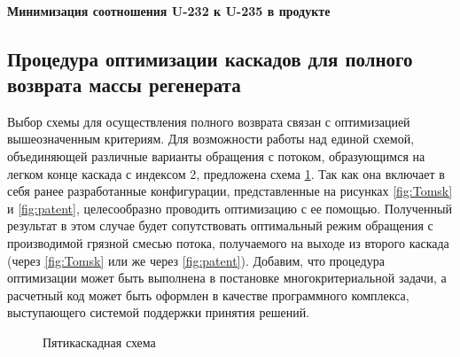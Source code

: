 \paragraph{Минимизация соотношения U-232 к U-235 в продукте}

\subsection{Процедура оптимизации каскадов для полного возврата массы регенерата}\label{sec:ch2/sec5.2}
Выбор схемы для осуществления полного возврата связан с оптимизацией вышеозначенным критериям. Для возможности работы над единой схемой, объединяющей различные варианты обращения с потоком, образующимся на легком конце каскада с индексом 2, предложена схема \ref{fig:Total scheme}. Так как она включает в себя ранее разработанные конфигурации, представленные на рисунках \ref{fig:Tomsk} и \ref{fig:patent}, целесообразно проводить оптимизацию с ее помощью. Полученный результат в этом случае будет сопутствовать оптимальный режим обращения с производимой грязной смесью потока, получаемого на выходе из второго каскада (через \ref{fig:Tomsk} или же через \ref{fig:patent}).
Добавим, что процедура оптимизации может быть выполнена в постановке многокритериальной задачи, а расчетный код может быть оформлен в качестве программного комплекса, выступающего системой поддержки принятия решений.

\begin{figure}[ht]
  \caption{Пятикаскадная схема}\label{fig:Total scheme}
\end{figure}

